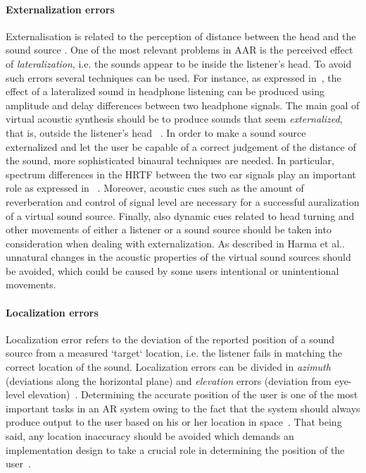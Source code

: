 \documentclass[journal]{IEEEtran}
\begin{document}
\paragraph{Externalization errors}
Externalisation is related to the perception of distance between the head and the sound source \cite{Tame2012}. One of the most relevant problems in AAR is the perceived effect of \emph{lateralization}, i.e. the sounds appear to be inside the listener's head. To avoid such errors several techniques can be used. For instance, as expressed in~\cite{harma2004}, the effect of a lateralized sound in headphone listening can be produced using amplitude and delay differences between two headphone signals. The main goal of virtual acoustic synthesis should be to produce sounds that seem \emph{externalized}, that is, outside the listener's head ~\cite{begault2001}. In order to make a sound source externalized and let the user be capable of a correct judgement of the distance of the sound, more sophisticated binaural techniques are needed. In particular, spectrum differences in the HRTF between the two ear signals play an important role as expressed in ~\cite{harma2004}. Moreover, acoustic cues such as the amount of reverberation and control of signal level are necessary for a successful auralization of a virtual sound source. Finally, also dynamic cues related to head turning and other movements of either a listener or a sound source should be taken into consideration when dealing with externalization. As described in Harma et al..~\cite{harma2004} unnatural changes in the acoustic properties of the virtual sound sources should be avoided, which could be caused by some users intentional or unintentional movements.

\paragraph{Localization errors}
Localization error refers to the deviation of the reported position of a sound source from a measured `target` location, i.e. the listener fails in matching the correct location of the sound. Localization errors can be divided in \emph{azimuth} (deviations along the horizontal plane) and \emph{elevation} errors (deviation from eye-level elevation)~\cite{begault2001}. Determining the accurate position of the user is one of the most important tasks in an AR system owing to the fact that the system should always produce output to the user based on his or her location in space~\cite{rozier2000}. That being said, any location inaccuracy should be avoided which demands an implementation design to take a crucial role in determining the position of the user~\cite{alvarez2011}.
\end{document}
